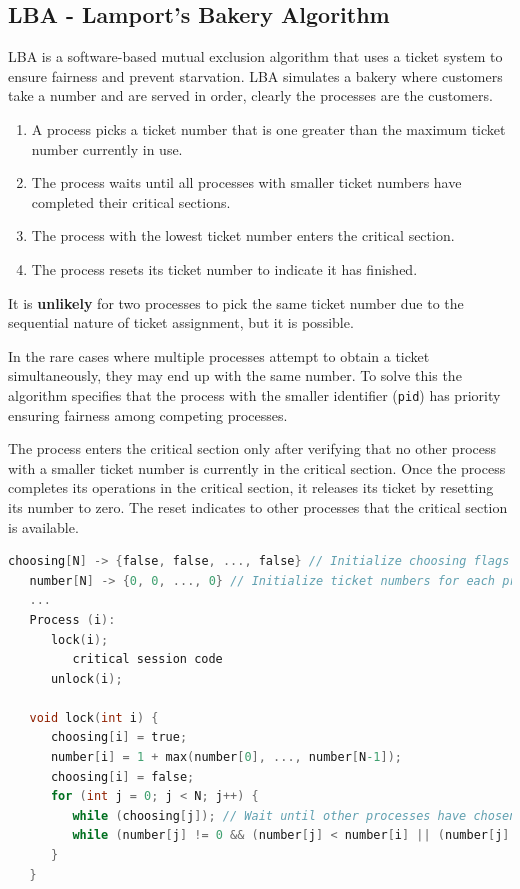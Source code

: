 \subsection{LBA - Lamport's Bakery Algorithm}
LBA is a software-based mutual exclusion algorithm that uses a ticket system to ensure fairness and prevent starvation.
LBA simulates a bakery where customers take a number and are served in order, clearly the processes are the customers.

\begin{enumerate}
   \item A process picks a ticket number that is one greater than the maximum ticket number currently in use.
   \item The process waits until all processes with smaller ticket numbers have completed their critical sections.
   \item The process with the lowest ticket number enters the critical section.
   \item The process resets its ticket number to indicate it has finished.
\end{enumerate}

It is \textbf{unlikely} for two processes to pick the same ticket number due to the sequential nature of ticket assignment, but it is possible.

In the rare cases where multiple processes attempt to obtain a ticket simultaneously, they may end up with the same number. To solve this the algorithm specifies that the process with the smaller identifier (\texttt{pid}) has priority ensuring fairness among competing processes.

The process enters the critical section only after verifying that no other process with a smaller ticket number is currently in the critical section.
Once the process completes its operations in the critical section, it releases its ticket by resetting its number to zero. The reset indicates to other processes that the critical section is available.

\begin{lstlisting}[language=C]
   choosing[N] -> {false, false, ..., false} // Initialize choosing flags for each process
   number[N] -> {0, 0, ..., 0} // Initialize ticket numbers for each process
   ...
   Process (i):
      lock(i);
         critical session code
      unlock(i);

   void lock(int i) {
      choosing[i] = true;
      number[i] = 1 + max(number[0], ..., number[N-1]);
      choosing[i] = false;
      for (int j = 0; j < N; j++) {
         while (choosing[j]); // Wait until other processes have chosen
         while (number[j] != 0 && (number[j] < number[i] || (number[j] == number[i] && j < i)));
      }
   }
\end{lstlisting}

